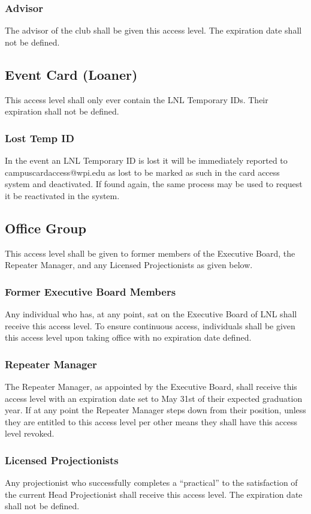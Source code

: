 \documentclass[12pt,letterpaper,oneside]{book}
\begin{document}
\subsubsection{Advisor}
The advisor of the club shall be given this access level. The expiration date shall not be defined.

\subsection{Event Card (Loaner)}
This access level shall only ever contain the LNL Temporary IDs. Their expiration shall not be defined.

\subsubsection{Lost Temp ID}
In the event an LNL Temporary ID is lost it will be immediately reported to campuscardaccess@wpi.edu as lost to be marked as such in the card access system and deactivated. If found again, the same process may be used to request it be reactivated in the system.

\subsection{Office Group}
This access level shall be given to former members of the Executive Board, the Repeater Manager, and any Licensed Projectionists as given below.

\subsubsection{Former Executive Board Members}
Any individual who has, at any point, sat on the Executive Board of LNL shall receive this access level. To ensure continuous access, individuals shall be given this access level upon taking office with no expiration date defined.

\subsubsection{Repeater Manager}
The Repeater Manager, as appointed by the Executive Board, shall receive this access level with an expiration date set to May 31st of their expected graduation year. If at any point the Repeater Manager steps down from their position, unless they are entitled to this access level per other means they shall have this access level revoked.

\subsubsection{Licensed Projectionists}
Any projectionist who successfully completes a ``practical'' to the satisfaction of the current Head Projectionist shall receive this access level. The expiration date shall not be defined.
\end{document}
